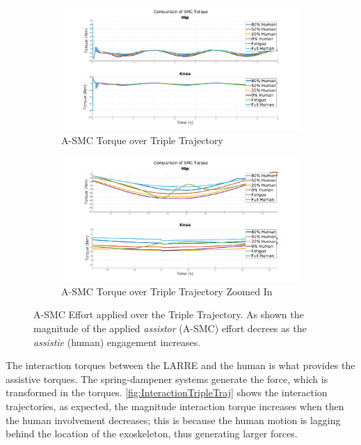 \begin{figure}
    \begin{subfigure}{\linewidth}
        \centering
        \includegraphics[width=\columnwidth]{images/controllers/trajs/SMC_full.png}
        \caption[A-SMC Torque over Triple Trajectory]{A-SMC Torque over Triple Trajectory}
        \label{fig:SMCTripleFull}
    \end{subfigure}
    \begin{subfigure}{\linewidth}
        \centering
        \includegraphics[width=\columnwidth]{images/controllers/trajs/SMC_zoom.png}
        \caption[A-SMC Torque over Triple Trajectory Zoomed]{A-SMC Torque over Triple Trajectory Zoomed In}
        \label{fig:SMCTripleZoom}
    \end{subfigure}
    \caption[A-SMC Effort applied over the Triple Trajectory]{A-SMC Effort applied over the Triple Trajectory. As shown the magnitude of the applied \textit{assistor} (A-SMC) effort decrees as the \textit{assistie} (human) engagement increases. }
    \label{fig:SMCEffortTriple}
\end{figure}

The interaction torques between the LARRE and the human is what provides the assistive torques. The spring-dampener systems generate the force, which is transformed in the torques. \autoref{fig:InteractionTripleTraj} shows the interaction trajectories, as expected, the magnitude interaction torque increases when then the human involvement decreases; this is because the human motion is lagging behind the location of the exoskeleton, thus generating larger forces. 

